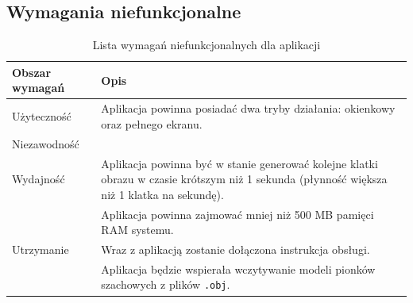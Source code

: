 \documentclass[10pt,a4paper]{article}
\begin{document}
\subsection{Wymagania niefunkcjonalne}
%

\begin{table}[H]
	\begin{tabularx}{\textwidth}{|l|X|}
		\hline
		\textbf{Obszar wymagań} & \textbf{Opis} \\
		\hline
		Użyteczność & Aplikacja powinna posiadać dwa tryby działania: okienkowy oraz pełnego ekranu. \\
		\hline
		Niezawodność &  \\
		\hline
		Wydajność & Aplikacja powinna być w stanie generować kolejne klatki obrazu w czasie krótszym niż 1 sekunda (płynność większa niż 1 klatka na sekundę). \\
		\cline{2-2}
		& Aplikacja powinna zajmować mniej niż 500 MB pamięci RAM systemu. \\
		\hline
		Utrzymanie & Wraz z aplikacją zostanie dołączona instrukcja obsługi. \\
		\cline{2-2}
		& Aplikacja będzie wspierała wczytywanie modeli pionków szachowych z plików \texttt{.obj}. \\
		\hline
	\end{tabularx}
	\caption{Lista wymagań niefunkcjonalnych dla aplikacji}
\end{table}
\end{document}
